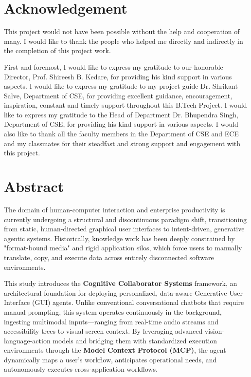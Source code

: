 \documentclass[12pt, a4paper]{report}
\begin{document}
\newpage
\chapter*{Acknowledgement}

This project would not have been possible without the help and cooperation of many. I would like to thank the people who helped me directly and indirectly in the completion of this project work.

First and foremost, I would like to express my gratitude to our honorable Director, Prof. Shireesh B. Kedare, for providing his kind support in various aspects. I would like to express my gratitude to my project guide Dr. Shrikant Salve, Department of CSE, for providing excellent guidance, encouragement, inspiration, constant and timely support throughout this B.Tech Project. I would like to express my gratitude to the Head of Department Dr. Bhupendra Singh, Department of CSE, for providing his kind support in various aspects. I would also like to thank all the faculty members in the Department of CSE and ECE and my classmates for their steadfast and strong support and engagement with this project.


\newpage
\chapter*{Abstract}

The domain of human-computer interaction and enterprise productivity is currently undergoing a structural and discontinuous paradigm shift, transitioning from static, human-directed graphical user interfaces to intent-driven, generative agentic systems. Historically, knowledge work has been deeply constrained by "format-bound media" and rigid application silos, which force users to manually translate, copy, and execute data across entirely disconnected software environments.

This study introduces the \textbf{Cognitive Collaborator Systems} framework, an architectural foundation for deploying personalized, data-aware Generative User Interface (GUI) agents. Unlike conventional conversational chatbots that require manual prompting, this system operates continuously in the background, ingesting multimodal inputs—ranging from real-time audio streams and accessibility trees to visual screen context. By leveraging advanced vision-language-action models and bridging them with standardized execution environments through the \textbf{Model Context Protocol (MCP)}, the agent dynamically maps a user's workflow, anticipates operational needs, and autonomously executes cross-application workflows.
\end{document}
